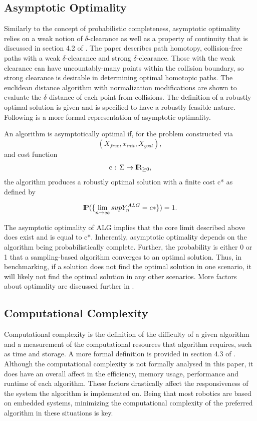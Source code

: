 \documentclass[conference]{IEEEtran} \usepackage[T1]{fontenc} \usepackage[backend=biber, style=ieee]{biblatex}
\begin{document}
\subsection{Asymptotic Optimality} \label{Asymptotic Optimality}

Similarly to the concept of probabilistic completeness, asymptotic optimality relies on a weak notion of $\delta$-clearance as well as a property of continuity that is 
discussed in section 4.2 of \cite{rrt_star}.  The paper describes path homotopy, collision-free paths with a weak $\delta$-clearance and strong $\delta$-clearance.
Those with the weak clearance can have uncountably-many points within the collision boundary, so strong clearance is desirable in determining optimal homotopic paths.
The euclidean distance algorithm with normalization modifications are shown to evaluate the $\delta$ distance of each point from collisions. The definition of a robustly optimal
solution is given and is specified to have a robustly feasible nature. Following is a more formal representation of asymptotic optimality.

An algorithm is asymptotically optimal if, for the problem constructed via \[(X_{free}, x_{init}, X_{goal}),\] and cost function \[ \text{c : } \Sigma \to {\rm I\!R} _{\ge 0}, \] the algorithm produces a robustly optimal solution with a finite cost c* as defined by

\[{\rm I\!P}(\{\lim_{n\to\infty} sup Y_n^{ALG}=c*\}) = 1.\] 

The asymptotic optimality of ALG implies that the core limit described above does exist and is equal to c*.
Inherently, asymptotic optimality depends on the algorithm being probabilistically complete. Further, 
the probability is either 0 or 1 that a sampling-based algorithm converges to an optimal solution. 
Thus, in benchmarking, if a solution does not find the optimal solution in one scenario, it will likely
not find the optimal solution in any other scenarios. More factors about optimality are
discussed further in \cite{rrt_star}.

\subsection{Computational Complexity} \label{Computational Complexity}

Computational complexity is the definition of the difficulty of a given algorithm and a measurement of the
computational resources that algorithm requires, such as time and storage. A more formal definition is 
provided in section 4.3 of \cite{rrt_star}. Although the computational complexity is not formally analysed 
in this paper, it does have an overall affect in the efficiency, memory usage, performance and runtime of 
each algorithm. These factors drastically affect the responsiveness of the system the algorithm is 
implemented on. Being that most robotics are based on embedded systems, minimizing the computational 
complexity of the preferred algorithm in these situations is key.
\end{document}
